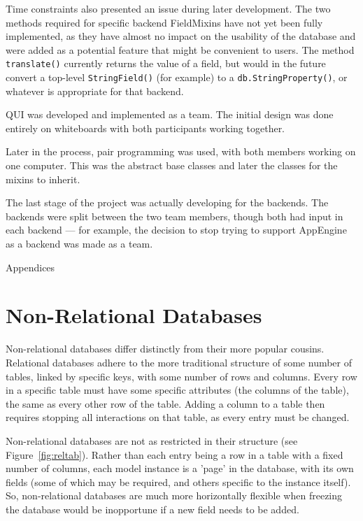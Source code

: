 \documentclass{article} %
\newcommand{\il}[1]{\mbox{\lstinline{#1}}}
\begin{document}
Time constraints also presented an issue during later development. The two methods required for specific backend FieldMixins have not yet been fully implemented, as 
they have almost no impact on the usability of the database and were added as a potential feature that might be convenient to users. The method \il{translate()} currently returns the 
value of a field, but would in the future convert a top-level \il{StringField()} (for example) to a \il{db.StringProperty()}, or whatever is appropriate for that backend.

QUI was developed and implemented as a team. The initial design was done entirely on whiteboards with both participants working together.

  Later in the process, pair programming was used, with both members working on one computer. This was the abstract base classes and later the classes for the mixins to inherit. 
  
  The last stage of the project was actually developing for the backends. The backends were split between the two team members, though both had input in each backend --- for example, the
   decision to stop trying to support AppEngine as a backend was made as a team.

\newpage
\appendix
\begin{center}Appendices\end{center}

\section{Non-Relational Databases}
Non-relational databases differ distinctly from their more popular cousins. Relational databases adhere to the more traditional structure of some number of tables, linked
by specific keys, with some number of rows and columns. Every row in a specific table must have some specific attributes (the columns of the table), the same as every 
other row of the table. Adding a column to a table then requires stopping all interactions on that table, as every entry must be changed. 

Non-relational databases are not as restricted in their structure (see Figure~\ref{fig:reltab}). Rather than each entry being a row in a table with a fixed number of 
columns, each model instance is a 'page' in the database, with its own fields (some of which may be required, and others specific to the instance itself). So, 
non-relational databases are much more horizontally flexible when freezing the database would be inopportune if a new field needs to be added.
\end{document}
